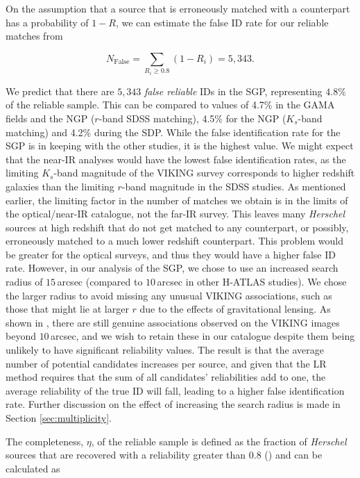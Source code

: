 On the assumption that a source that is erroneously matched with a counterpart has a probability of $1 - R$, we can estimate the false ID rate for our reliable matches from

\begin{equation}
    N_{\textrm{False}} = \sum_{R_i \geq 0.8} (1 - R_i) = 5,343.
\label{eq:false_ids}
\end{equation}

We predict that there are $5,343$ \textit{false reliable} IDs in the SGP, representing $4.8\%$ of the reliable sample. This can be compared to values of 4.7\% in the GAMA fields and the NGP ($r$-band SDSS matching), 4.5\% for the NGP ($K_s$-band matching) and 4.2\% during the SDP. While the false identification rate for the SGP is in keeping with the other studies, it is the highest value. We might expect that the near-IR analyses would have the lowest false identification rates, as the limiting $K_s$-band magnitude of the VIKING survey corresponds to higher redshift galaxies than the limiting $r$-band magnitude in the SDSS studies. As mentioned earlier, the limiting factor in the number of matches we obtain is in the limits of the optical/near-IR catalogue, not the far-IR survey. This leaves many \textit{Herschel} sources at high redshift that do not get matched to any counterpart, or possibly, erroneously matched to a much lower redshift counterpart. This problem would be greater for the optical surveys, and thus they would have a higher false ID rate. However, in our analysis of the SGP, we chose to use an increased search radius of $15\,$arcsec (compared to $10\,$arcsec in other H-ATLAS studies). We chose the larger radius to avoid missing any unusual VIKING associations, such as those that might lie at larger $r$ due to the effects of gravitational lensing. As shown in \citealt{Bakx_2020}, there are still genuine associations observed on the VIKING images beyond $10\,$arcsec, and we wish to retain these in our catalogue despite them being unlikely to have significant reliability values. The result is that the average number of potential candidates increases per source, and given that the LR method requires that the sum of all candidates' reliabilities add to one, the average reliability of the true ID will fall, leading to a higher false identification rate. Further discussion on the effect of increasing the search radius is made in Section \ref{sec:multiplicity}.

The completeness, $\eta$, of the reliable sample is defined as the fraction of \textit{Herschel} sources that are recovered with a reliability greater than $0.8$ (\citealt{Smith_2011}) and can be calculated as

